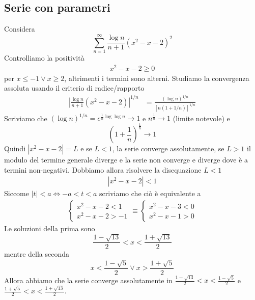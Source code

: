 \documentclass[a4paper]{article}
\begin{document}
\subsection{Serie con parametri}

\begin{snippetexample}{}
    Considera
    \[
        \sum_{n=1}^\infty \frac{\log n}{n+1}{\left(x^2-x-2\right)}^2
    \]
    Controlliamo la positività
    \begin{align*}
        x^2 - x - 2 \geq 0
    \end{align*}
    per \(x \leq - 1 \lor x \geq 2\), altrimenti i termini sono alterni.
    Studiamo la convergenza assoluta usando il criterio di radice/rapporto
    \begin{align*}
        {\left|\frac{\log n}{n+1}(x^2 - x - 2)\right|}^{1/n}
        &= \frac{{\left(\log n\right)}^{1/n}}{{\left[n(1+1/n)\right]}^{1/n}}
    \end{align*}
    Scriviamo che \({\left(\log n\right)}^{1/n} = e^{\frac{1}{n}\log\log n} \to 1\)
    e \(n^{\frac{1}{n}} \to 1\) (limite notevole)
    e
    \[
        {\left(1 + \frac{1}{n}\right)}^{\frac{1}{n}} \to 1
    \]
    Quindi \(|x^2 - x - 2| = L\)
    e se \(L < 1\), la serie converge assolutamente, se \(L> 1\) il modulo del termine generale diverge e la serie non converge
    e diverge dove è a termini non-negativi.
    Dobbiamo allora risolvere la disequazione \(L<1\)
    \begin{align*}
        |x^2 - x - 2| < 1
    \end{align*}
    Siccome \(|t| < a \iff -a < t < a\) scriviamo che ciò è equivalente a
    \begin{align*}
        \begin{cases}
            x^2 - x - 2 < 1 \\
            x^2 - x - 2 > -1
        \end{cases}
        \equiv
        \begin{cases}
            x^2 - x - 3 < 0 \\
            x^2 - x - 1 > 0
        \end{cases}
    \end{align*}
    Le soluzioni della prima sono
    \[
        \frac{1-\sqrt{13}}{2} < x < \frac{1 + \sqrt{13}}{2}
    \]
    mentre della seconda
    \[
        x < \frac{1-\sqrt{5}}{2} \lor x > \frac{1 + \sqrt{5}}{2}
    \]
    Allora abbiamo che la serie converge assolutamente in \(\frac{1-\sqrt{13}}{2} < x < \frac{1 - \sqrt{5}}{2}\)
    e \(\frac{1 + \sqrt{5}}{2} < x < \frac{1+\sqrt{13}}{2}\).

\end{snippetexample}
\end{document}
